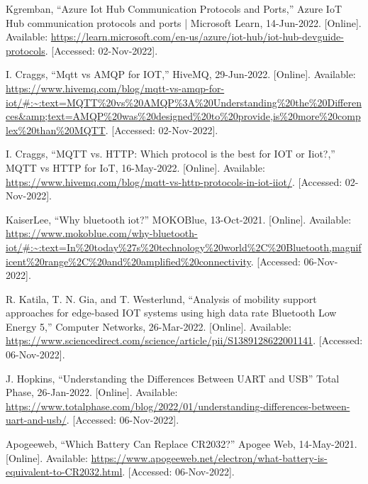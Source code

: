 \begin{thebibliography}{00}
     Kgremban, “Azure Iot Hub Communication Protocols and Ports,” Azure IoT Hub communication protocols and ports | Microsoft Learn, 14-Jun-2022. [Online]. Available: \url{https://learn.microsoft.com/en-us/azure/iot-hub/iot-hub-devguide-protocols}. [Accessed: 02-Nov-2022]. 

     I. Craggs, “Mqtt vs AMQP for IOT,” HiveMQ, 29-Jun-2022. [Online]. Available: \url{https://www.hivemq.com/blog/mqtt-vs-amqp-for-iot/#:~:text=MQTT%20vs%20AMQP%3A%20Understanding%20the%20Differences&amp;text=AMQP%20was%20designed%20to%20provide,is%20more%20complex%20than%20MQTT}. [Accessed: 02-Nov-2022]. 
    
     I. Craggs, “MQTT vs. HTTP: Which protocol is the best for IOT or Iiot?,” MQTT vs HTTP for IoT, 16-May-2022. [Online]. Available: \url{https://www.hivemq.com/blog/mqtt-vs-http-protocols-in-iot-iiot/}. [Accessed: 02-Nov-2022]. 
    
     KaiserLee, “Why bluetooth iot?” MOKOBlue, 13-Oct-2021. [Online]. Available: \url{https://www.mokoblue.com/why-bluetooth-iot/#:~:text=In%20today%27s%20technology%20world%2C%20Bluetooth,magnificent%20range%2C%20and%20amplified%20connectivity}. [Accessed: 06-Nov-2022]. 
    
     R. Katila, T. N. Gia, and T. Westerlund, “Analysis of mobility support approaches for edge-based IOT systems using high data rate Bluetooth Low Energy 5,” Computer Networks, 26-Mar-2022. [Online]. Available: \url{https://www.sciencedirect.com/science/article/pii/S1389128622001141}. [Accessed: 06-Nov-2022].
    
     J. Hopkins, “Understanding the Differences Between UART and USB” Total Phase, 26-Jan-2022. [Online]. Available: \url{https://www.totalphase.com/blog/2022/01/understanding-differences-between-uart-and-usb/}. [Accessed: 06-Nov-2022].

     Apogeeweb, “Which Battery Can Replace CR2032?” Apogee Web, 14-May-2021. [Online]. Available: \url{https://www.apogeeweb.net/electron/what-battery-is-equivalent-to-CR2032.html}. [Accessed: 06-Nov-2022].
\end{thebibliography}